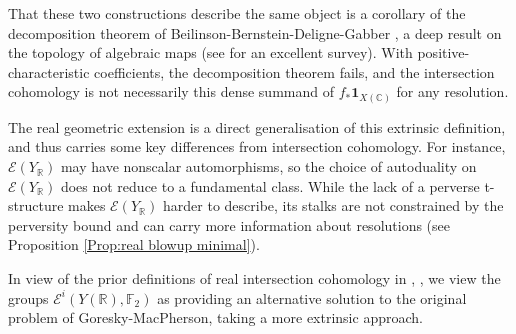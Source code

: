 \documentclass{amsart}
\theoremstyle{definition}
\theoremstyle{remark}
\begin{document}
That these two constructions describe the same object is a corollary of the decomposition theorem of Beilinson-Bernstein-Deligne-Gabber \cite{BBD}, a deep result on the topology of algebraic maps (see \cite{deCataldo2009decomposition} for an excellent survey). With positive-characteristic coefficients, the decomposition theorem fails, and the intersection cohomology is not necessarily this dense summand of $f_*\mathbf{1}_{X(\mathbb{C})}$ for any resolution.

The real geometric extension is a direct generalisation of this extrinsic definition, and thus carries some key differences from intersection cohomology. For instance, $\mathscr{E}(Y_\mathbb{R})$ may have nonscalar automorphisms, so the choice of autoduality on $\mathscr{E}(Y_\mathbb{R})$ does not reduce to a fundamental class. While the lack of a perverse t-structure makes $\mathscr{E}(Y_\mathbb{R})$ harder to describe, its stalks are not constrained by the perversity bound and can carry more information about resolutions (see Proposition \ref{Prop:real blowup minimal}).

In view of the prior definitions of real intersection cohomology in \cite{Realintersectionhomology}, \cite{VanHamel}, we view the groups $\mathscr{E}^i(Y(\mathbb{R}),\mathbb{F}_2)$ as providing an alternative solution to the original problem of Goresky-MacPherson, taking a more extrinsic approach.
\end{document}
